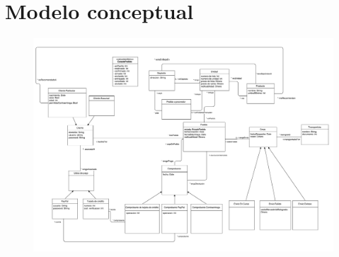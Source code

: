 \section{Modelo conceptual}

\begin{figure}[H]
  \begin{center}
  \includegraphics[angle=90,height=\textheight]{images/conceptual.pdf}
  \end{center}
\end{figure}

\clearpage

